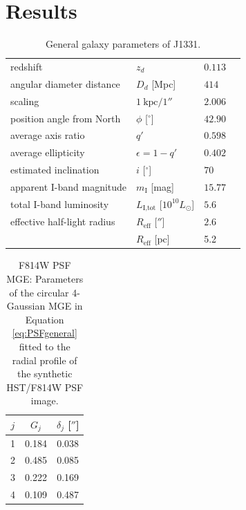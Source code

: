 \documentclass[useAMS,usenatbib]{mnras}
\begin{document}
\section{Results} \label{sec:Results}

\begin{table}
\centering
\caption{General galaxy parameters of J1331.}
\begin{tabular}{lllr}
\hline
redshift \citep{SWELLSIII}                 & $z_d$ & $0.113$ \\
angular diameter distance & $D_d$ [Mpc] & $414$ \\
scaling                   & $1~\text{kpc} / 1''$ & $2.006$ \\
position angle from North          & $\phi$ [$^\circ$] & $42.90$\\
average axis ratio & $q'$ & $0.598$\\
average ellipticity & $\epsilon = 1 - q'$ & $0.402$ \\
estimated inclination & $i$ [$^\circ$] & $70$\\
apparent I-band magnitude & $m_\text{I}$ [mag] & $15.77$ \\
total I-band luminosity & $L_\text{I,tot}$ [$10^{10} L_\odot$] & $5.6$ \\
effective half-light radius & $R_\text{eff}$ [$''$] & $2.6$ \\
& $R_\text{eff}$ [pc]& 5.2 & \\
\hline
\end{tabular}
\label{tab:galaxyparameters}
\end{table}

\begin{table}
\centering
\caption{F814W PSF MGE: Parameters of the circular 4-Gaussian MGE in Equation \eqref{eq:PSFgeneral} fitted to the radial profile of the synthetic HST/F814W PSF image.}
\begin{tabular}{ccc}
\hline
$j$ & $G_j$ & $\delta_j$ [$''$] \\\hline
1 & 0.184 & 0.038\\
2 & 0.485 & 0.085\\
3 & 0.222 & 0.169\\
4 & 0.109 & 0.487\\\hline
\end{tabular}
\label{tab:PSFMGEF814W}
\end{table}
\end{document}
